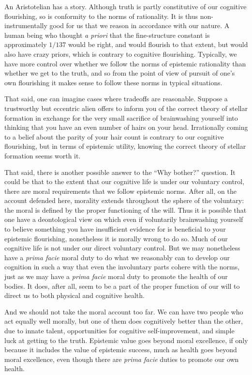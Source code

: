 An Aristotelian has a story. Although truth is partly constitutive of our cognitive flourishing, so is conformity 
to the norms of rationality. It is thus non-instrumentally good for us that we reason in accordance with our 
nature. A human being who thought \textit{a priori} that the fine-structure constant is approximately $1/137$
would be right, and would flourish to that extent, but would also have crazy priors, which is contrary to 
cognitive flourishing. Typically, we have more control over whether we follow the norms of epistemic rationality
than whether we get to the truth, and so from the point of view of pursuit of one's own flourishing it makes
sense to follow these norms in typical situations.

That said, one can imagine cases where tradeoffs are reasonable. Suppose a trustworthy but eccentric alien
offers to inform you of the correct theory of stellar formation in exchange for the very small sacrifice 
of brainwashing yourself into thinking that you have an even number of hairs on your head. Irrationally
coming to a belief about the parity of your hair count is contrary to our cognitive flourishing, but in terms 
of epistemic utility, knowing the correct theory of stellar formation seems worth it.

That said, there is another possible answer to the ``Why bother?'' question. It could be that to the extent
that our cognitive life is under our voluntary control, there are moral requirements that we follow epistemic
norms. After all, on the account defended here, morality extends throughout the sphere of the voluntary: 
the moral is defined by the proper functioning of the will. Thus it is possible that one have a deontological
view on which even if voluntarily brainwashing yourself to believe something you have insufficient evidence 
for is beneficial to your epistemic flourishing, nonetheless it is morally wrong to do so. 
Much of our cognitive life is not under our direct voluntary control. But we may nonetheless have a 
\textit{prima facie} moral duty  to do what we reasonably can to develop our cognition in such a way that even the 
involuntary parts cohere with the norms, just as we may have a \textit{prima facie} moral duty to promote the 
health of our bodies. It does, after all, seem to be a part of the proper function of our will to direct us to 
both physical and cognitive health.

And we should not take the moral account too far. We can have two people who act equally well morally, but one 
of them does cognitively better than the other, due to innate talent, opportunities for cognitive self-improvement,
and simple luck at getting to the truth. Epistemic value goes beyond moral excellence, if only because it includes 
the value of epistemic success, much as health goes beyond moral excellence, even though there are \textit{prima 
facie} duties to promote our own health.



